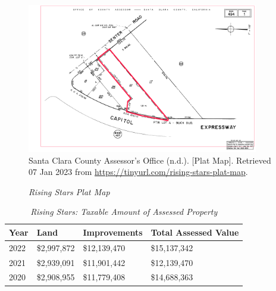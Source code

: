 \begin{figure}[hbtp]
    \caption[Rising Stars Plat Map]{\textit{Rising Stars Plat Map}}\label{fig:rising-stars-plat-map}
    \includegraphics[width=0.9\textwidth]{Assessor-Info/rising-stars-plat-map-494-01}\\ %
    \footnotesize{Santa Clara County Assessor's Office (n.d.). [Plat Map]. Retrieved 07 Jan 2023 from  \url{https://tinyurl.com/rising-stars-plat-map}}.
\end{figure}

\begin{table}[hbtp]
  \SingleSpacing%
  \caption[Rising Stars: Taxable Amount of Assessed Propery]{\textit{Rising Stars: Taxable Amount of Assessed Property}}\label{tab:rising-stars-taxable-amount}
  \begin{tabular}{llll}
    \toprule
    Year & Land        & Improvements & Total Assessed Value \\
    \midrule
    2022 & \$2,997,872 & \$12,139,470 & \$15,137,342 \\
    2021 & \$2,939,091 & \$11,901,442 & \$12,139,470 \\
    2020 & \$2,908,955 & \$11,779,408 & \$14,688,363 \\
    \bottomrule
  \end{tabular}
\end{table}

